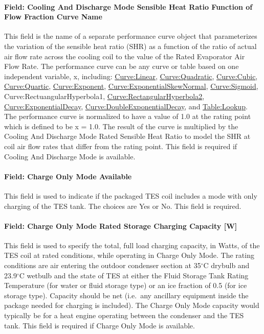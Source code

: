\paragraph{Field: Cooling And Discharge Mode Sensible Heat Ratio Function of Flow Fraction Curve Name}\label{field-cooling-and-discharge-mode-sensible-heat-ratio-function-of-flow-fraction-curve-name}

This field is the name of a separate performance curve object that parameterizes the variation of the sensible heat ratio (SHR) as a function of the ratio of actual air flow rate across the cooling coil to the value of the Rated Evaporator Air Flow Rate. The performance curve can be any curve or table based on one independent variable, x, including: \hyperref[curvelinear]{Curve:Linear}, \hyperref[curvequadratic]{Curve:Quadratic}, \hyperref[curvecubic]{Curve:Cubic}, \hyperref[curvequartic]{Curve:Quartic}, \hyperref[curveexponent]{Curve:Exponent}, \hyperref[curveexponentialskewnormal]{Curve:ExponentialSkewNormal}, \hyperref[curvesigmoid]{Curve:Sigmoid}, Curve:RectuangularHyperbola1, \hyperref[curverectangularhyperbola2]{Curve:RectangularHyperbola2}, \hyperref[curveexponentialdecay]{Curve:ExponentialDecay}, \hyperref[curvedoubleexponentialdecay]{Curve:DoubleExponentialDecay}, and \hyperref[tablelookup]{Table:Lookup}. The performance curve is normalized to have a value of 1.0 at the rating point which is defined to be x = 1.0. The result of the curve is multiplied by the Cooling And Discharge Mode Rated Sensible Heat Ratio to model the SHR at coil air flow rates that differ from the rating point. This field is required if Cooling And Discharge Mode is available.

\paragraph{Field: Charge Only Mode Available}\label{field-charge-only-mode-available}

This field is used to indicate if the packaged TES coil includes a mode with only charging of the TES tank. The choices are Yes or No. This field is required.

\paragraph{Field: Charge Only Mode Rated Storage Charging Capacity {[}W{]}}\label{field-charge-only-mode-rated-storage-charging-capacity-w}

This field is used to specify the total, full load charging capacity, in Watts, of the TES coil at rated conditions, while operating in Charge Only Mode. The rating conditions are air entering the outdoor condenser section at 35$^\circ$C drybulb and 23.9$^\circ$C wetbulb and the state of TES at either the Fluid Storage Tank Rating Temperature (for water or fluid storage type) or an ice fraction of 0.5 (for ice storage type). Capacity should be net (i.e.~any ancillary equipment inside the package needed for charging is included). The Charge Only Mode capacity would typically be for a heat engine operating between the condenser and the TES tank. This field is required if Charge Only Mode is available.

